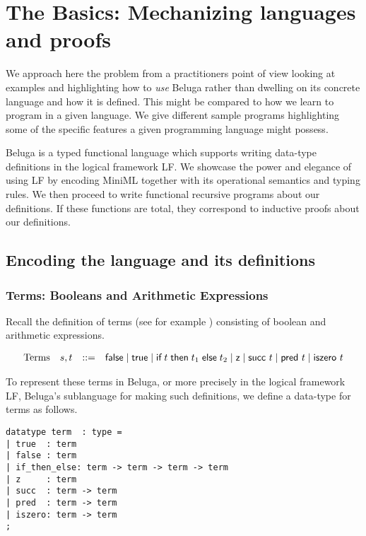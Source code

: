 \chapter{The Basics: Mechanizing languages and proofs}
We approach here the problem from a practitioners point of view looking at
examples and highlighting how to \emph{use} Beluga rather than dwelling on its
concrete language and how it is defined. This might be compared to how we learn to program in a
given language. We give different sample programs highlighting some of the
specific features a given programming language might possess.

Beluga is a typed functional language which supports writing data-type
definitions in the logical framework LF. We showcase the
power and elegance of using LF by encoding MiniML together with its operational
semantics and typing rules. We then proceed to write functional recursive
programs about our definitions. If these functions are total, they correspond to
inductive proofs about our definitions.

\section{Encoding the language and its definitions}
\subsection{Terms: Booleans and Arithmetic Expressions}
Recall the definition of terms (see for example \cite[Ch 3, Fig 3-2]{TAPL})
consisting of boolean and arithmetic expressions.

\[
\begin{array}{llcl}
\mbox{Terms} & s,t & \mathrel{::=} & \textsf{false} \mid \textsf{true} \mid \textsf{if\;} t \textsf{\;then\;} t_1 \textsf{\;else\;} t_2 \mid
\textsf{z} \mid \textsf{succ}~t \mid \textsf{pred}~t \mid \textsf{iszero}~t
\end{array}
\]

To represent these terms in Beluga, or more precisely in the logical framework
LF, Beluga's sublanguage for making such definitions, we define a data-type for terms as follows.

\begin{lstlisting}
datatype term  : type =
| true  : term
| false : term
| if_then_else: term -> term -> term -> term
| z     : term
| succ  : term -> term
| pred  : term -> term
| iszero: term -> term
;
\end{lstlisting}

